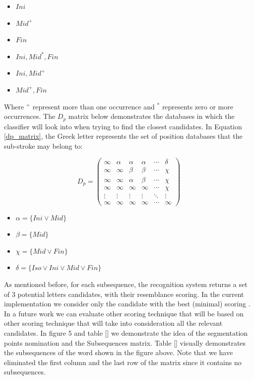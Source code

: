 \documentclass[journal,compsoc]{IEEEtran}
\begin{document}
\begin{multicols}{2}
\begin{itemize}
    \item $Ini$
    \item $Mid^{+}$
    \item $Fin$
    \item $Ini,Mid^{*},Fin$
    \item $Ini,Mid^{+}$
    \item $Mid^{+},Fin$
\end{itemize}
\end{multicols}
Where $^+$ represent more than one occurrence and $^*$ represents zero or more occurrences. The $D_p$ matrix below demonstrates the databases in which the classifier will look into when trying to find the closest candidates. In Equation \ref{dp_matrix}, the Greek letter represents the set of position databases that the sub-stroke may belong to:

\begin{equation}
D_{p}=
\left( \begin{array}{cccccc}
\infty & \alpha & \alpha & \alpha & \cdots & \delta \\
\infty & \infty & \beta & \beta & \cdots & \chi \\
\infty & \infty & \alpha & \beta & \cdots & \chi \\
\infty & \infty & \infty & \infty & \cdots & \chi \\
\vdots & \vdots & \vdots & \vdots & \ddots & \vdots \\
\infty & \infty & \infty & \infty & \cdots & \infty \end{array} \right)
\label{dp_matrix}
\end{equation}

\begin{itemize}
    \item[] $\alpha=\{Ini \vee Mid\}$
    \item[] $\beta=\{Mid\}$
    \item[] $\chi=\{Mid \vee Fin\}$
    \item[] $\delta=\{Iso \vee Ini \vee Mid \vee Fin\}$
\end{itemize}

As mentioned before, for each subsequence, the recognition system returns a set of 3 potential letters candidates, with their resemblance scoring. In the current implementation we consider only the candidate with the best (minimal) scoring . In a future work we can evaluate other scoring technique that will be based on other scoring technique that will take into consideration all the relevant candidates.
In figure 5 and table [] we demonstrate the idea of the segmentation points nomination and the Subsequences matrix.
Table [] visually demonstrates the subsequences of the word shown in the figure above. Note that we have eliminated the first column and the last row of the matrix since it contains no subsequences.
\end{document}
